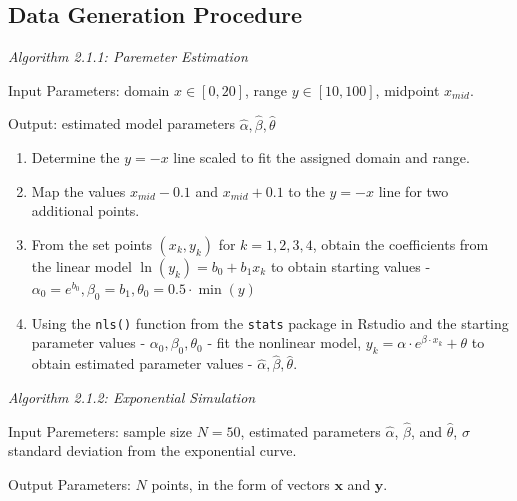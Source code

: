 \clearpage



\begin{appendix}
\clearpage
\appendix

\hypertarget{data-generation-procedure}{%
\section{\texorpdfstring{Data Generation
Procedure\label{app:generation}}{Data Generation Procedure}}\label{data-generation-procedure}}

\textit{Algorithm 2.1.1: Paremeter Estimation}

Input Parameters: domain \(x\in[0,20]\), range \(y\in[10,100]\),
midpoint \(x_{mid}\).

Output: estimated model parameters \(\hat\alpha, \hat\beta, \hat\theta\)

\begin{enumerate}
\def\labelenumi{\arabic{enumi}.}
\item
  Determine the \(y=-x\) line scaled to fit the assigned domain and
  range.
\item
  Map the values \(x_{mid} - 0.1\) and \(x_{mid} + 0.1\) to the \(y=-x\)
  line for two additional points.
\item
  From the set points \((x_k, y_k)\) for \(k = 1,2,3,4\), obtain the
  coefficients from the linear model \(\ln(y_k) = b_0 +b_1x_k\) to
  obtain starting values -
  \(\alpha_0 = e^{b_0}, \beta_0 = b_1, \theta_0 = 0.5\cdot \min(y)\)
\item
  Using the \texttt{nls()} function from the \texttt{stats} package in
  Rstudio and the starting parameter values -
  \(\alpha_0, \beta_0, \theta_0\) - fit the nonlinear model,
  \(y_k = \alpha\cdot e^{\beta\cdot x_k}+\theta\) to obtain estimated
  parameter values - \(\hat\alpha, \hat\beta, \hat\theta.\)
\end{enumerate}

\noindent\textit{Algorithm 2.1.2: Exponential Simulation}

Input Paremeters: sample size \(N = 50\), estimated parameters
\(\hat\alpha\), \(\hat\beta\), and \(\hat\theta\), \(\sigma\) standard
\indent deviation from the exponential curve.

Output Parameters: \(N\) points, in the form of vectors \(\mathbf{x}\)
and \(\mathbf{y}\).


\end{appendix}
